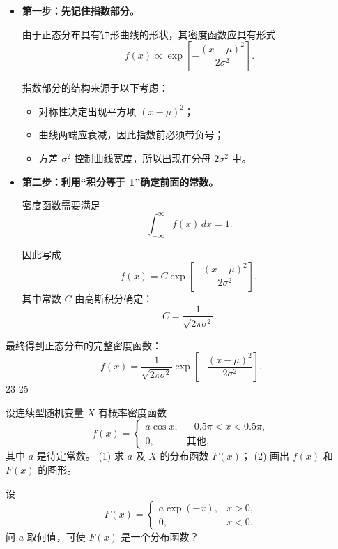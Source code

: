 \begin{itemize}
    \item \textbf{第一步：先记住指数部分。}

    由于正态分布具有钟形曲线的形状，其密度函数应具有形式
    \[
        f(x) \propto 
        \exp\!\left[-\frac{(x-\mu)^2}{2\sigma^2}\right].
    \]

    指数部分的结构来源于以下考虑：
    \begin{itemize}
        \item 对称性决定出现平方项 $(x-\mu)^2$；
        \item 曲线两端应衰减，因此指数前必须带负号；
        \item 方差 $\sigma^2$ 控制曲线宽度，所以出现在分母 $2\sigma^2$ 中。
    \end{itemize}

    \item \textbf{第二步：利用“积分等于 1”确定前面的常数。}

    密度函数需要满足
    \[
        \int_{-\infty}^{\infty} f(x)\,dx = 1.
    \]

    因此写成
    \[
        f(x) = C \exp\!\left[-\frac{(x-\mu)^2}{2\sigma^2}\right],
    \]
    其中常数 $C$ 由高斯积分确定：
    \[
        C = \frac{1}{\sqrt{2\pi\sigma^2}}.
    \]

\end{itemize}

最终得到正态分布的完整密度函数：
\[
    f(x)=\frac{1}{\sqrt{2\pi\sigma^{2}}}
    \exp\!\left[-\frac{(x-\mu)^{2}}{2\sigma^{2}}\right].
\]
23-25
\begin{homework}[2.23]
设连续型随机变量 $X$ 有概率密度函数
\[
f(x) =
\begin{cases}
a \cos x, & -0.5\pi < x < 0.5\pi, \\[6pt]
0, & \text{其他},
\end{cases}
\]
其中 $a$ 是待定常数。  
(1) 求 $a$ 及 $X$ 的分布函数 $F(x)$；  
(2) 画出 $f(x)$ 和 $F(x)$ 的图形。
\end{homework}

\begin{homework}[2.24]
设
\[
F(x) =
\begin{cases}
a \exp(-x), & x > 0, \\
0, & x < 0.
\end{cases}
\]
问 $a$ 取何值，可使 $F(x)$ 是一个分布函数？
\end{homework}

